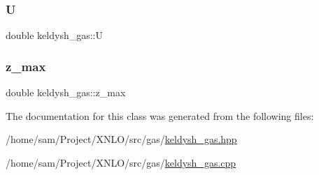 \mbox{\label{classkeldysh__gas_a752b70afe289a798cc0ab7b688b9ed3d}} 
\subsubsection{\texorpdfstring{U}{U}}
{\footnotesize\ttfamily double keldysh\+\_\+gas\+::U}

\mbox{\label{classkeldysh__gas_a117691dd8b6fd06b34a73392c0e73e32}} 
\subsubsection{\texorpdfstring{z\+\_\+max}{z\_max}}
{\footnotesize\ttfamily double keldysh\+\_\+gas\+::z\+\_\+max}



The documentation for this class was generated from the following files\+:\begin{DoxyCompactItemize}
\item 
/home/sam/\+Project/\+X\+N\+L\+O/src/gas/\hyperlink{keldysh__gas_8hpp}{keldysh\+\_\+gas.\+hpp}\item 
/home/sam/\+Project/\+X\+N\+L\+O/src/gas/\hyperlink{keldysh__gas_8cpp}{keldysh\+\_\+gas.\+cpp}\end{DoxyCompactItemize}
